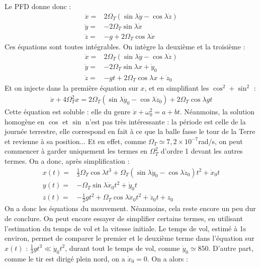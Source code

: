 \documentclass{report}
\begin{document}
\begin{itemize}
Le PFD donne donc :
	\begin{align*}
        \ddot{x}=&2\Omega_T(\sin\lambda\dot{y}-\cos\lambda\dot{z})\\ 
        \ddot{y}=&-2\Omega_T\sin\lambda\dot{x} \\
        \ddot{z}=&-g+2\Omega_T\cos\lambda\dot{x}
	\end{align*}
Ces équations sont toutes intégrables. On intègre la deuxième et la troisième :
	\begin{align*}
        \ddot{x}=&2\Omega_T(\sin\lambda\dot{y}-\cos\lambda\dot{z})\\ 
        \dot{y}=&-2\Omega_T\sin\lambda x + \dot{y}_0 \\
        \dot{z}=&-gt+2\Omega_T\cos\lambda x + \dot{z}_0
	\end{align*}
Et on injecte dans la première équation sur $x$, et en simplifiant les $\cos^2+\sin^2$ : 
\begin{align*}
	\ddot{x}+4\Omega_T^2x=2\Omega_T(\sin\lambda\dot{y}_0-\cos\lambda\dot{z}_0)+2\Omega_T\cos\lambda gt
\end{align*}
	Cette équation est soluble : elle du genre $\ddot{x}+\omega_0^2=a+bt$. Néanmoins, la solution homogène en $\cos$ et $\sin$ n'est pas très intéressante : la période est celle de la journée terrestre, elle correspond en fait à ce que la balle fasse le tour de la Terre et revienne à sa position... Et en effet, comme $\Omega_T\simeq7,2\times10^{-7}$rad/s, on peut commencer à garder uniquement les termes en $\Omega_T^2$ d'ordre 1 devant les autres termes. On a donc, après simplification :
	\begin{align*}
        x(t)=& \frac{1}{3}\Omega_T\cos\lambda t^3+\Omega_T(\sin\lambda\dot{y}_0-\cos\lambda\dot{z}_0)t^2+\dot{x}_0t\\ 
        y(t)=&-\Omega_T\sin\lambda \dot{x}_0t^2 + \dot{y}_0t \\
        z(t)=&-\frac{1}{2} gt^2+\Omega_T\cos\lambda \dot{x}_0t^2 + \dot{z}_0t+z_0
	\end{align*}	
On a donc les équations du mouvement. Néanmoins, cela reste encore un peu dur de conclure. On peut encore essayer de simplifier certains termes, en utilisant l'estimation du temps de vol et la vitesse initiale. Le temps de vol, estimé à 1s environ, permet de comparer le premier et le deuxième terme dans l'équation sur $x(t)$ : $\frac{1}{3}gt^3\ll\dot{y}_0t^2$, durant tout le temps de vol, comme $\dot{y}_0\simeq 850$. D'autre part, comme le tir est dirigé plein nord, on a $\dot{x}_0=0$. On a alors :
	\begin{align*}

\end{align*}
\end{itemize}
\end{document}

